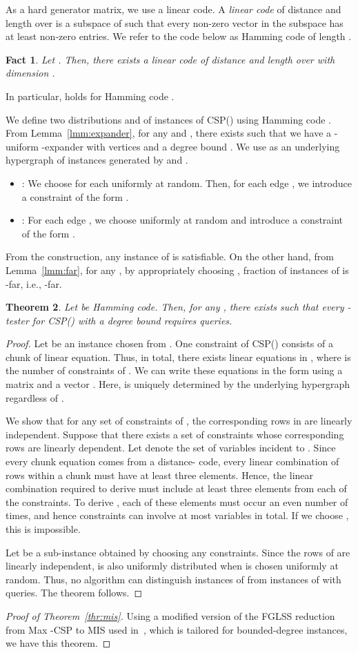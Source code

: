 \documentclass[letterpaper,11pt]{article}
\newtheorem{theorem}{Theorem}[section]
\newtheorem{fact}[theorem]{Fact}
\newcommand{\mis}{\textsf{MIS}\xspace}
\newcommand{\csp}[1]{\textsf{CSP}(#1)\xspace}
\newcommand{\maxkcsp}{\textsf{Max -CSP}\xspace}
\begin{document}
As a hard generator matrix, we use a linear code.
A \textit{linear code} of distance  and length  over  is a subspace of  such that every non-zero vector in the subspace has at least  non-zero entries.
We refer to the code below as Hamming code of length .
\begin{fact}
  Let .
  Then, there exists a linear code of distance  and length  over  with dimension .
\end{fact}
In particular,  holds for Hamming code .

We define two distributions  and  of instances of \csp{} using Hamming code .
From Lemma~\ref{lmm:expander}, 
for any  and ,
there exists  such that we have a -uniform -expander  with  vertices and a degree bound .
We use  as an underlying hypergraph of instances generated by  and .
\begin{itemize}
  \item : 
    We choose  for each  uniformly at random. 
    Then, for each edge , 
    we introduce a constraint of the form .
  \item :
    For each edge ,
    we choose  uniformly at random and introduce a constraint of the form .
\end{itemize}
From the construction,
any instance of  is satisfiable.
On the other hand, 
from Lemma~\ref{lmm:far}, 
for any , by appropriately choosing ,
 fraction of instances of  is -far, i.e., -far.

\begin{theorem}\label{thr:generator-hardness}
  Let  be Hamming code.
  Then, for any , 
  there exists  such that every -tester for \csp{} with a degree bound  requires  queries.
\end{theorem}
\begin{proof}
  Let  be an instance chosen from .
  One constraint of \csp{} consists of a chunk of  linear equation.
  Thus, in total, there exists  linear equations in ,
  where  is the number of constraints of .
  We can write these equations in the form  using a matrix  and a vector .
  Here,  is uniquely determined by the underlying hypergraph  regardless of .

  We show that for any set of  constraints of , 
  the corresponding rows in  are linearly independent.
  Suppose that there exists a set  of  constraints whose corresponding rows are linearly dependent.
  Let  denote the set of variables incident to .
  Since every chunk equation comes from a distance- code, every linear combination of rows within a chunk must have at least three elements.
  Hence, the linear combination required to derive  must include at least three elements from each of the  constraints.
  To derive , each of these elements must occur an even number of times,
  and hence  constraints can involve at most  variables in total.
  If we choose , this is impossible.

  Let  be a sub-instance obtained by choosing any  constraints.
  Since the rows of  are linearly independent,  is also uniformly distributed when  is chosen uniformly at random.
  Thus, no algorithm can distinguish instances of  from instances of  with  queries.
  The theorem follows.
\end{proof}

\begin{proof}[Proof of Theorem~\ref{thr:mis}]
Using a modified version of the FGLSS reduction from \maxkcsp to \mis used in~\cite{Tre01}, 
which is tailored for bounded-degree instances,
we have this theorem.
\end{proof}
\end{document}
